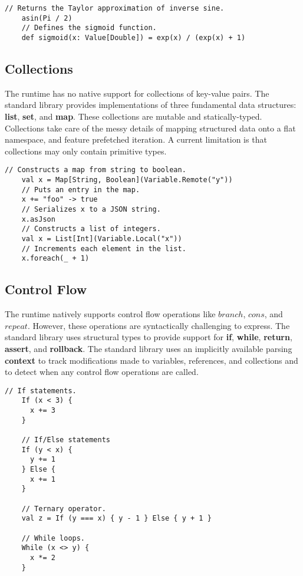 \documentclass[../main.tex]{subfiles}
\begin{document}
  \begin{lstlisting}[style=Scala]
    // Returns the Taylor approximation of inverse sine.
    asin(Pi / 2)
    // Defines the sigmoid function.
    def sigmoid(x: Value[Double]) = exp(x) / (exp(x) + 1)
  \end{lstlisting}

  \subsection{Collections}
  The runtime has no native support for collections of key-value pairs. The standard library
  provides implementations of three fundamental data structures: \textbf{list}, \textbf{set},
  and \textbf{map}. These collections are mutable and statically-typed. Collections take care of the
  messy details of mapping structured data onto a flat namespace, and feature prefetched iteration.
  A current limitation is that collections may only contain primitive types.

  \begin{lstlisting}[style=Scala]
    // Constructs a map from string to boolean.
    val x = Map[String, Boolean](Variable.Remote("y"))
    // Puts an entry in the map.
    x += "foo" -> true
    // Serializes x to a JSON string.
    x.asJson
    // Constructs a list of integers.
    val x = List[Int](Variable.Local("x"))
    // Increments each element in the list.
    x.foreach(_ + 1)
  \end{lstlisting}

  \subsection{Control Flow}
  The runtime natively supports control flow operations like $branch$, $cons$, and $repeat$.
  However, these operations are syntactically challenging to express. The standard library
  uses structural types to provide support for \textbf{if}, \textbf{while}, \textbf{return},
  \textbf{assert}, and \textbf{rollback}. The standard library uses an implicitly available parsing
  \textbf{context} to track modifications made to variables, references, and collections and to
  detect when any control flow operations are called.

  \begin{lstlisting}[style=Scala]
    // If statements.
    If (x < 3) {
      x += 3
    }

    // If/Else statements
    If (y < x) {
      y += 1
    } Else {
      x += 1
    }

    // Ternary operator.
    val z = If (y === x) { y - 1 } Else { y + 1 }

    // While loops.
    While (x <> y) {
      x *= 2
    }
  \end{lstlisting}
\end{document}
